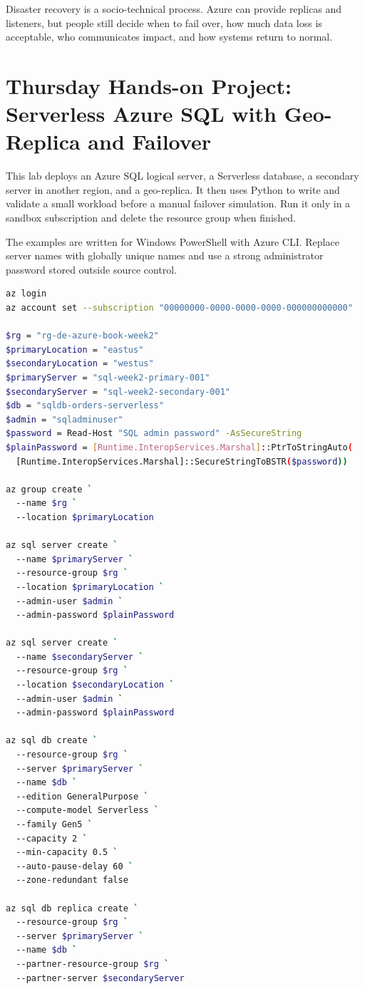 \begin{notebox}
Disaster recovery is a socio-technical process. Azure can provide replicas and listeners, but people still decide when to fail over, how much data loss is acceptable, who communicates impact, and how systems return to normal.
\end{notebox}

\section{Thursday Hands-on Project: Serverless Azure SQL with Geo-Replica and Failover}
This lab deploys an Azure SQL logical server, a Serverless database, a secondary server in another region, and a geo-replica. It then uses Python to write and validate a small workload before a manual failover simulation. Run it only in a sandbox subscription and delete the resource group when finished.

\begin{notebox}
The examples are written for Windows PowerShell with Azure CLI. Replace server names with globally unique names and use a strong administrator password stored outside source control.
\end{notebox}

\begin{lstlisting}[language=bash,caption={Deploying Azure SQL Database Serverless and creating a geo-replica with Azure CLI.},label={lst:ch2-sql-serverless-cli}]
az login
az account set --subscription "00000000-0000-0000-0000-000000000000"

$rg = "rg-de-azure-book-week2"
$primaryLocation = "eastus"
$secondaryLocation = "westus"
$primaryServer = "sql-week2-primary-001"
$secondaryServer = "sql-week2-secondary-001"
$db = "sqldb-orders-serverless"
$admin = "sqladminuser"
$password = Read-Host "SQL admin password" -AsSecureString
$plainPassword = [Runtime.InteropServices.Marshal]::PtrToStringAuto(
  [Runtime.InteropServices.Marshal]::SecureStringToBSTR($password))

az group create `
  --name $rg `
  --location $primaryLocation

az sql server create `
  --name $primaryServer `
  --resource-group $rg `
  --location $primaryLocation `
  --admin-user $admin `
  --admin-password $plainPassword

az sql server create `
  --name $secondaryServer `
  --resource-group $rg `
  --location $secondaryLocation `
  --admin-user $admin `
  --admin-password $plainPassword

az sql db create `
  --resource-group $rg `
  --server $primaryServer `
  --name $db `
  --edition GeneralPurpose `
  --compute-model Serverless `
  --family Gen5 `
  --capacity 2 `
  --min-capacity 0.5 `
  --auto-pause-delay 60 `
  --zone-redundant false

az sql db replica create `
  --resource-group $rg `
  --server $primaryServer `
  --name $db `
  --partner-resource-group $rg `
  --partner-server $secondaryServer
\end{lstlisting}

